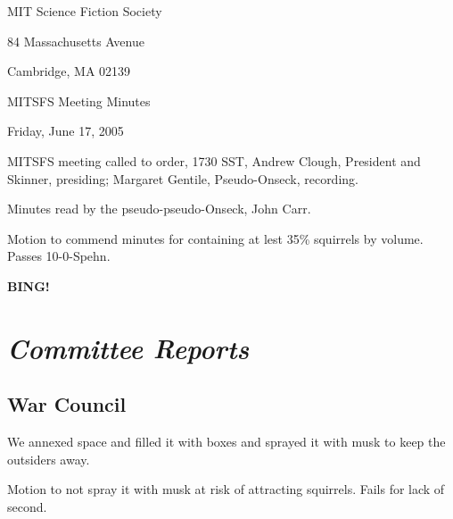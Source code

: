\documentclass[10pt]{article}
\newcommand{\bing}{{\bf BING!} }
\newcommand{\goto}[1]{\bing \vskip 12pt \section*{{\em{#1}}}}
\begin{document}
\begin{center}

MIT Science Fiction Society

84 Massachusetts Avenue

Cambridge, MA 02139

\vspace{12pt}

MITSFS Meeting Minutes

Friday, June 17, 2005

\end{center}

\vspace{18pt}

\setlength{\parskip}{6pt}

\noindent
MITSFS meeting called to order, 1730 SST, Andrew Clough, President and
Skinner, presiding; Margaret Gentile, Pseudo-Onseck, recording.

Minutes read by the pseudo-pseudo-Onseck, John Carr.

Motion to commend minutes for containing at lest 35\% squirrels
by volume.  Passes \hbox{10-0-Spehn}.

\goto{Committee Reports}
\subsection*{War Council}

We annexed space and filled it with boxes and sprayed
it with musk to keep the outsiders away.

Motion to not spray it with musk at risk of attracting squirrels.
Fails for lack of second.




\end{document}
